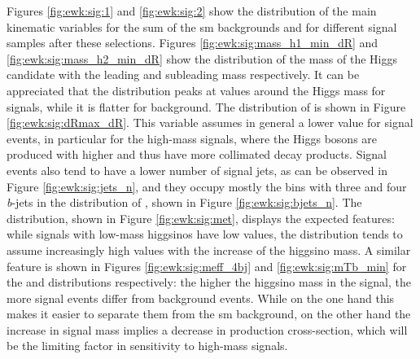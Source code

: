 Figures \ref{fig:ewk:sig:1} and \ref{fig:ewk:sig:2}  show the distribution of the main kinematic variables for 
the sum of the \gls{sm} backgrounds and for different signal samples after these selections.
Figures \ref{fig:ewk:sig:mass_h1_min_dR} and \ref{fig:ewk:sig:mass_h2_min_dR} show the distribution of the mass of the Higgs 
candidate with the leading and subleading mass respectively. 
It can be appreciated that the distribution peaks at values around the Higgs mass for 
signals, while it is flatter for background. 
The distribution of \dRmax is shown in Figure \ref{fig:ewk:sig:dRmax_dR}. This variable assumes in general a lower value for 
signal events, in particular for the high-mass signals, where the Higgs bosons are produced with higher \pt and thus have 
more collimated decay products. Signal events also tend to have a lower number of signal jets, as can be observed in Figure 
\ref{fig:ewk:sig:jets_n}, and they occupy mostly the bins with three and four \textit{b}-jets in the 
distribution of \nbjet, shown in Figure \ref{fig:ewk:sig:bjets_n}. 
The \met distribution, shown in Figure \ref{fig:ewk:sig:met}, displays the expected features: while signals with low-mass higgsinos 
have low \met values, the distribution tends to assume increasingly high values with the increase of the higgsino mass. 
A similar feature is shown in Figures \ref{fig:ewk:sig:meff_4bj} and \ref{fig:ewk:sig:mTb_min} for the \meffb and \mtb distributions respectively: 
the higher the higgsino mass in the signal, the more signal events differ from background events. 
While on the one hand this makes it easier to separate them from the \gls{sm} background, on the other hand the increase in signal mass 
implies a decrease in production cross-section, which will be the limiting factor in sensitivity to high-mass signals. 

